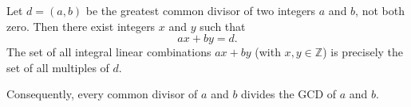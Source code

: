 Let $d = (a, b)$ be the greatest common divisor of two integers $a$ and $b$, not both zero. Then there exist integers $x$ and $y$ such that
$$ax + by = d.$$
The set of all integral linear combinations $ax + by$ (with $x, y \in \mathbb{Z}$) is precisely the set of all multiples of $d$.

Consequently, every common divisor of $a$ and $b$ divides the GCD of $a$ and $b$.
